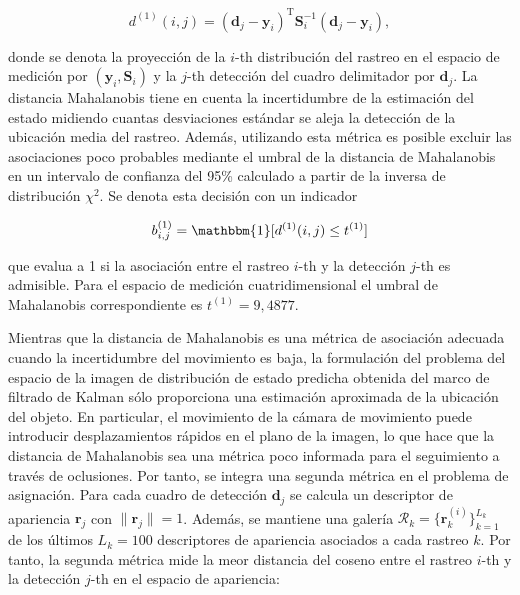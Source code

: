\begin{equation}
\label{eq:equation1-deepsort}
d^{(1)} (i,j) = (\boldsymbol{d}_{j} - \boldsymbol{y}_{i})^{\text{T}} \boldsymbol{S}_{i}^{-1} (\boldsymbol{d}_{j} - \boldsymbol{y}_{i}),
\end{equation}

donde se denota la proyección de la $i$-th distribución del rastreo en el espacio de medición por $(\boldsymbol{y}_{i}, \boldsymbol{S}_{i})$ y la $j$-th detección del cuadro delimitador por $\boldsymbol{d}_{j}$. La distancia Mahalanobis tiene en cuenta la incertidumbre de la estimación del estado midiendo cuantas desviaciones estándar se aleja la detección de la ubicación media del rastreo. Además, utilizando esta métrica es posible excluir las asociaciones poco probables mediante el umbral de la distancia de Mahalanobis en un intervalo de confianza del 95\% calculado a partir de la inversa de distribución $\chi^{2}$. Se denota esta decisión con un indicador

\begin{equation}
\label{eq:equation2-deepsort}
b_{i,j}^{(1)} = \mathbbm{1}[d^{(1)} (i,j) \leq t^{(1)}]
\end{equation}

que evalua a 1 si la asociación entre el rastreo $i$-th y la detección $j$-th es admisible. Para el espacio de medición cuatridimensional el umbral de Mahalanobis correspondiente es $t^{(1)} = 9,4877$.

Mientras que la distancia de Mahalanobis es una métrica de asociación adecuada cuando la incertidumbre del movimiento es baja, la formulación del problema del espacio de la imagen de distribución de estado predicha obtenida del marco de filtrado de Kalman sólo proporciona una estimación aproximada de la ubicación del objeto. En particular, el movimiento de la cámara de movimiento puede introducir desplazamientos rápidos en el plano de la imagen, lo que hace que la distancia de Mahalanobis sea una métrica poco informada para el seguimiento a través de oclusiones. Por tanto, se integra una segunda métrica en el problema de asignación. Para cada cuadro de detección $\boldsymbol{d}_{j}$ se calcula un descriptor de apariencia $\boldsymbol{r}_{j}$ con $\parallel \boldsymbol{r}_{j} \parallel = 1$. Además, se mantiene una galería $\mathcal{R}_{k} = \{\boldsymbol{r}_{k}^{(i)}\}_{k=1}^{L_{k}}$ de los últimos $L_{k} = 100$ descriptores de apariencia asociados a cada rastreo $k$. Por tanto, la segunda métrica mide la meor distancia del coseno entre el rastreo $i$-th y la detección $j$-th en el espacio de apariencia:

